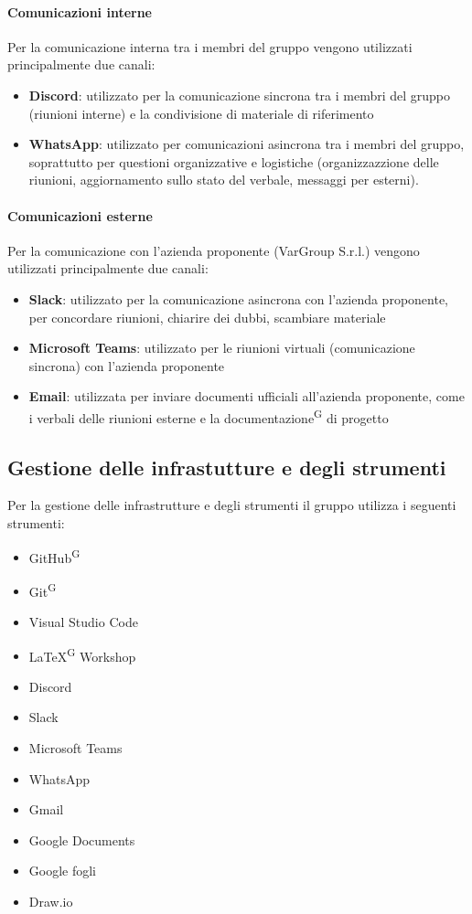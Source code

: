 \documentclass[a4paper, 11pt]{article}
\begin{document}
\paragraph{Comunicazioni interne}
Per la comunicazione interna tra i membri del gruppo vengono utilizzati principalmente due canali:
\begin{itemize}
    \item \textbf{Discord}: utilizzato per la comunicazione sincrona tra i membri del gruppo (riunioni interne) e la condivisione di materiale di riferimento 
    \item \textbf{WhatsApp}: utilizzato per comunicazioni asincrona tra i membri del gruppo, soprattutto per questioni organizzative e logistiche (organizzazzione delle riunioni, aggiornamento sullo stato del verbale, messaggi per esterni).
\end{itemize}
\paragraph{Comunicazioni esterne}
Per la comunicazione con l'azienda proponente (VarGroup S.r.l.) vengono utilizzati principalmente due canali:
\begin{itemize}
    \item \textbf{Slack}: utilizzato per la comunicazione asincrona con l'azienda proponente, per concordare riunioni, chiarire dei dubbi, scambiare materiale
    \item \textbf{Microsoft Teams}: utilizzato per le riunioni virtuali (comunicazione sincrona) con l'azienda proponente
    \item \textbf{Email}: utilizzata per inviare documenti ufficiali all'azienda proponente, come i verbali delle riunioni esterne e la documentazione\textsuperscript{G} di progetto
\end{itemize}

\subsection{Gestione delle infrastutture e degli strumenti}
Per la gestione delle infrastrutture e degli strumenti il gruppo utilizza i seguenti strumenti:
\begin{itemize}
    \item GitHub\textsuperscript{G}
    \item Git\textsuperscript{G}
    \item Visual Studio Code
    \item LaTeX\textsuperscript{G} Workshop
    \item Discord
    \item Slack
    \item Microsoft Teams
    \item WhatsApp
    \item Gmail
    \item Google Documents
    \item Google fogli
    \item Draw.io
\end{itemize}
\end{document}
